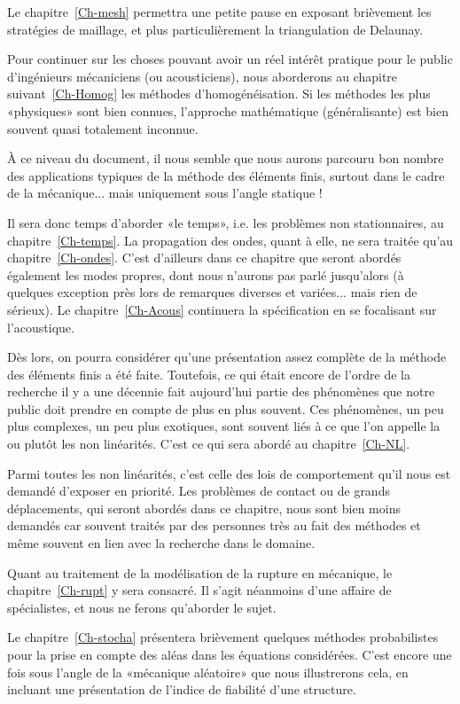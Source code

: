 \medskip
Le chapitre~\ref{Ch-mesh} permettra une petite pause en exposant brièvement les stratégies de maillage, et plus particulièrement la triangulation de Delaunay.

\medskip
Pour continuer sur les choses pouvant avoir un réel intérêt pratique pour le public d'ingénieurs mécaniciens (ou acousticiens), nous aborderons au chapitre suivant~\ref{Ch-Homog} les méthodes d'homogénéisation.
Si les méthodes les plus «physiques» sont bien connues, l'approche mathématique (généralisante) est bien souvent quasi totalement inconnue.

\medskip
À ce niveau du document, il nous semble que nous aurons parcouru bon nombre des applications typiques de la méthode des éléments finis, surtout dans le cadre de la mécanique... mais uniquement sous l'angle statique !

Il sera donc temps d'aborder «le temps», i.e. les problèmes non stationnaires, au chapitre~\ref{Ch-temps}.
La propagation des ondes, quant à elle, ne sera traitée qu'au chapitre~\ref{Ch-ondes}. C'est d'ailleurs dans ce chapitre que seront abordés également les modes propres, dont nous n'aurons pas parlé jusqu'alors (à quelques exception près lors de remarques diverses et variées... mais rien de sérieux). Le chapitre~\ref{Ch-Acous} continuera la spécification en se focalisant sur l'acoustique.

\medskip
Dès lors, on pourra considérer qu'une présentation assez complète de la méthode des éléments finis a été faite. Toutefois, ce qui était encore de l'ordre de la recherche il y a une décennie fait aujourd'hui partie des phénomènes que notre public doit prendre en compte de plus en plus souvent. Ces phénomènes, un peu plus complexes, un peu plus exotiques, sont souvent liés à ce que l'on appelle la ou plutôt les non linéarités. C'est ce qui sera abordé au chapitre~\ref{Ch-NL}.

Parmi toutes les non linéarités, c'est celle des lois de comportement qu'il nous est demandé d'exposer en priorité. Les problèmes de contact ou de grands déplacements, qui seront abordés dans ce chapitre, nous sont bien moins demandés car souvent traités par des personnes très au fait des méthodes et même souvent en lien avec la recherche dans le domaine.

\medskip
Quant au traitement de la modélisation de la rupture en mécanique, le chapitre~\ref{Ch-rupt} y sera consacré. Il s'agit néanmoins d'une affaire de spécialistes, et nous ne ferons qu'aborder le sujet.

\medskip
Le chapitre~\ref{Ch-stocha} présentera brièvement quelques méthodes probabilistes pour la prise en compte des aléas dans les équations considérées. C'est encore une fois sous l'angle de la «mécanique aléatoire» que nous illustrerons cela, en incluant une présentation de l'indice de fiabilité d'une structure.

